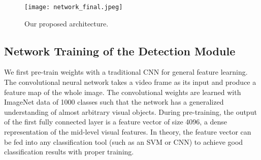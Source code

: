 \documentclass{article}
\begin{document}
\begin{figure}[t] %
	\centering
	\captionsetup{justification=centering}
	\texttt{[image: network\_final.jpeg]}
	\caption{Our proposed architecture.}
	\label{fig-network}
\end{figure}


\subsection{Network Training of the Detection Module}

We first pre-train weights with a traditional CNN for general feature learning. The convolutional neural network takes a video frame as its input and produce a feature map of the whole image.
The convolutional weights are learned with ImageNet data of 1000 classes such that the network has a generalized understanding of almost arbitrary visual objects. During pre-training, the output of the first fully connected layer is a feature vector of size 4096, a dense representation of the mid-level visual features. In theory, the feature vector can be fed into any classification tool (such as an SVM or CNN) to achieve good classification results with proper training.
\end{document}
